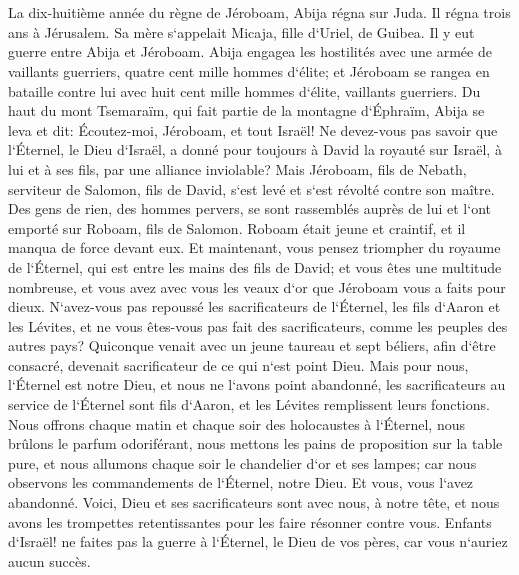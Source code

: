 \chapter{}

\verse La dix-huitième année du règne de Jéroboam, Abija régna sur Juda. 
\verse Il régna trois ans à Jérusalem. Sa mère s`appelait Micaja, fille d`Uriel, de Guibea. Il y eut guerre entre Abija et Jéroboam. 
\verse Abija engagea les hostilités avec une armée de vaillants guerriers, quatre cent mille hommes d`élite; et Jéroboam se rangea en bataille contre lui avec huit cent mille hommes d`élite, vaillants guerriers. 
\verse Du haut du mont Tsemaraïm, qui fait partie de la montagne d`Éphraïm, Abija se leva et dit: Écoutez-moi, Jéroboam, et tout Israël! 
\verse Ne devez-vous pas savoir que l`Éternel, le Dieu d`Israël, a donné pour toujours à David la royauté sur Israël, à lui et à ses fils, par une alliance inviolable? 
\verse Mais Jéroboam, fils de Nebath, serviteur de Salomon, fils de David, s`est levé et s`est révolté contre son maître. 
\verse Des gens de rien, des hommes pervers, se sont rassemblés auprès de lui et l`ont emporté sur Roboam, fils de Salomon. Roboam était jeune et craintif, et il manqua de force devant eux. 
\verse Et maintenant, vous pensez triompher du royaume de l`Éternel, qui est entre les mains des fils de David; et vous êtes une multitude nombreuse, et vous avez avec vous les veaux d`or que Jéroboam vous a faits pour dieux. 
\verse N`avez-vous pas repoussé les sacrificateurs de l`Éternel, les fils d`Aaron et les Lévites, et ne vous êtes-vous pas fait des sacrificateurs, comme les peuples des autres pays? Quiconque venait avec un jeune taureau et sept béliers, afin d`être consacré, devenait sacrificateur de ce qui n`est point Dieu. 
\verse Mais pour nous, l`Éternel est notre Dieu, et nous ne l`avons point abandonné, les sacrificateurs au service de l`Éternel sont fils d`Aaron, et les Lévites remplissent leurs fonctions. 
\verse Nous offrons chaque matin et chaque soir des holocaustes à l`Éternel, nous brûlons le parfum odoriférant, nous mettons les pains de proposition sur la table pure, et nous allumons chaque soir le chandelier d`or et ses lampes; car nous observons les commandements de l`Éternel, notre Dieu. Et vous, vous l`avez abandonné. 
\verse Voici, Dieu et ses sacrificateurs sont avec nous, à notre tête, et nous avons les trompettes retentissantes pour les faire résonner contre vous. Enfants d`Israël! ne faites pas la guerre à l`Éternel, le Dieu de vos pères, car vous n`auriez aucun succès. 
